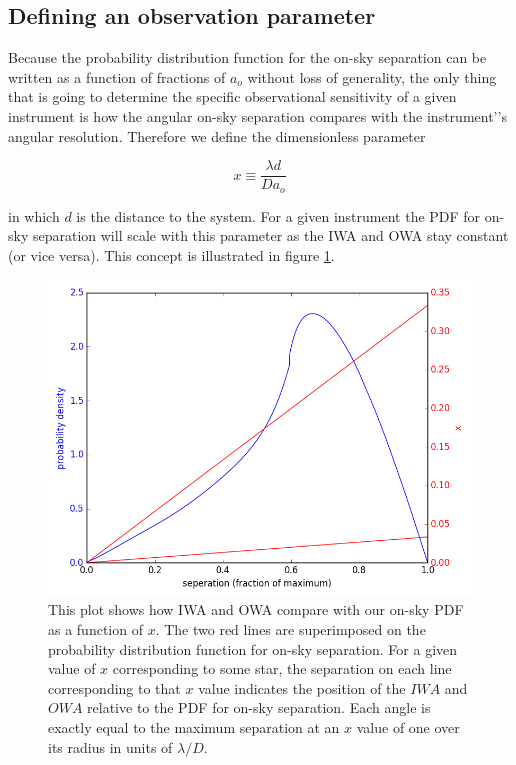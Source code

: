 \documentclass{article}
\begin{document}
	\subsection{Defining an observation parameter}
	
	Because the probability distribution function for the on-sky separation can be written as a function of  fractions of $a_{o}$ without loss of generality, the only thing that is going to determine the specific observational sensitivity of a given instrument is how the angular on-sky separation compares with the instrument’'s angular resolution. Therefore we define the dimensionless parameter 
	
	\begin{equation}
	x \equiv \frac{\lambda d}{D a_o}
	\end{equation}
	
in which $d$ is the distance to the system. For a given instrument the PDF for on-sky separation will scale with this parameter as the IWA and OWA stay constant (or vice versa). This concept is illustrated in figure \ref{fig:A_x}.
	
	\begin{figure}
		\includegraphics[width = \linewidth]{angles_pdf_LUVOIR.png}
		\caption{This plot shows how IWA and OWA compare with our on-sky PDF as a function of $x$. The two red lines are superimposed on the probability distribution function for on-sky separation. For a given value of $x$ corresponding to some star, the separation on each line corresponding to that $x$ value indicates the position of the $IWA$ and $OWA$ relative to the PDF for on-sky separation. Each angle is exactly equal to the maximum separation at an $x$ value of one over its radius in units of $\lambda / D$.}
		\label{fig:A_x}
	\end{figure}
	
\end{document}
